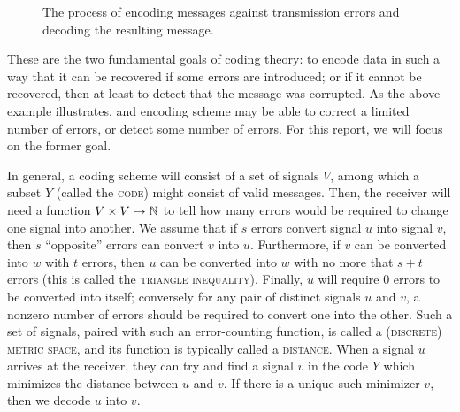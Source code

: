 \documentclass{report}
\begin{document}
    \begin{figure}[h]
      \centering
      \caption{The process of encoding messages against transmission errors and
        decoding the resulting message.}
    \end{figure}

    These are the two fundamental goals of coding theory: to encode data in such
    a way that it can be recovered if some errors are introduced; or if it
    cannot be recovered, then at least to detect that the message was corrupted.
    As the above example illustrates, and encoding scheme may be able to correct
    a limited number of errors, or detect some number of errors.  For this
    report, we will focus on the former goal.

    In general, a coding scheme will consist of a set of signals $V$, among
    which a subset $Y$ (called the \textsc{code}) might consist of valid
    messages.  Then, the receiver will need a function $V \times V \to \mathbb{N}$ to
    tell how many errors would be required to change one signal into another.
    We assume that if $s$ errors convert signal $u$ into signal $v$, then $s$
    ``opposite'' errors can convert $v$ into $u$.  Furthermore, if $v$ can be
    converted into $w$ with $t$ errors, then $u$ can be converted into $w$ with
    no more that $s + t$ errors (this is called the \textsc{triangle
    inequality}).  Finally, $u$ will require $0$ errors to be converted into
    itself; conversely for any pair of distinct signals $u$ and $v$, a nonzero
    number of errors should be required to convert one into the other.  Such a
    set of signals, paired with such an error-counting function, is called a
    \textsc{(discrete) metric space}, and its function is typically called a
    \textsc{distance}.  When a signal $u$ arrives at the receiver, they can try
    and find a signal $v$ in the code $Y$ which minimizes the distance between
    $u$ and $v$.  If there is a unique such minimizer $v$, then we decode $u$
    into $v$.
\end{document}

